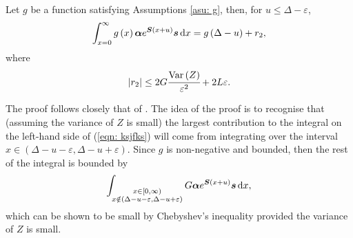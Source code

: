 \begin{lem}\label{lemma:bound}
	Let \(g\) be a function satisfying Assumptions \ref{asu: g}, then, for \(u \leq \Delta - \varepsilon\), 
	\begin{align}
		\int_{x=0}^\infty g\left(x\right)\boldsymbol \alpha e^{\boldsymbol{S}\left(x+u\right)} \boldsymbol s \, \mathrm{d} x = g\left(\Delta-u\right) + r_2,\label{eqn: ksjfks}
	\end{align}
	where 
	\[\left|r_2\right|\leq 2G\cfrac{\mathrm{Var} \left(Z\right)}{\varepsilon^2} + 2L\varepsilon.\]
\end{lem}
The proof follows closely that of \cite[Appendix A, Theorem 4]{hht2020}. The idea of the proof is to recognise that (assuming the variance of \(Z\) is small) the largest contribution to the integral on the left-hand side of (\ref{eqn: ksjfks}) will come from integrating over the interval \(x\in(\Delta-u-\varepsilon,\Delta-u+\varepsilon)\). Since \(g\) is non-negative and bounded, then the rest of the integral is bounded by 
\[\int_{\substack{x\in[0,\infty)\\x\notin(\Delta-u-\varepsilon,\Delta-u+\varepsilon)}} G\boldsymbol \alpha e^{\boldsymbol{S}\left(x+u\right)} \boldsymbol s \, \mathrm{d} x,\]
which can be shown to be small by Chebyshev's inequality provided the variance of \(Z\) is small. 

